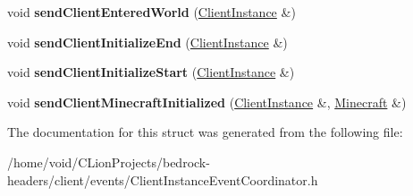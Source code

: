 \begin{DoxyCompactItemize}
void {\bfseries send\+Client\+Entered\+World} (\mbox{\hyperlink{struct_client_instance}{Client\+Instance}} \&)
\item 
\mbox{\label{struct_client_instance_event_coordinator_ac454dfda2f36450b3f8cd421af9727da}} 
void {\bfseries send\+Client\+Initialize\+End} (\mbox{\hyperlink{struct_client_instance}{Client\+Instance}} \&)
\item 
\mbox{\label{struct_client_instance_event_coordinator_a828ca7201084dad7de14a588723a2afc}} 
void {\bfseries send\+Client\+Initialize\+Start} (\mbox{\hyperlink{struct_client_instance}{Client\+Instance}} \&)
\item 
\mbox{\label{struct_client_instance_event_coordinator_ab7c86de58a59072dff038b2f81f183c6}} 
void {\bfseries send\+Client\+Minecraft\+Initialized} (\mbox{\hyperlink{struct_client_instance}{Client\+Instance}} \&, \mbox{\hyperlink{struct_minecraft}{Minecraft}} \&)
\end{DoxyCompactItemize}


The documentation for this struct was generated from the following file\+:\begin{DoxyCompactItemize}
\item 
/home/void/\+C\+Lion\+Projects/bedrock-\/headers/client/events/Client\+Instance\+Event\+Coordinator.\+h\end{DoxyCompactItemize}
